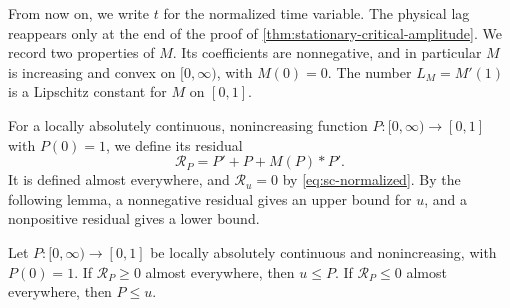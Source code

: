 From now on, we write $t$ for the normalized time variable. The physical lag reappears only at the end of the proof of \cref{thm:stationary-critical-amplitude}. We record two properties of $M$. Its coefficients are nonnegative, and in particular $M$ is increasing and convex on $[0,\infty)$, with $M(0)=0$. The number $L_M=M'(1)$ is a Lipschitz constant for $M$ on $[0,1]$.

For a locally absolutely continuous, nonincreasing function $P\colon[0,\infty)\to[0,1]$ with $P(0)=1$, we define its residual
\[
 \mathcal R_P=P'+P+M(P)*P' .
\]
It is defined almost everywhere, and $\mathcal R_u=0$ by \eqref{eq:sc-normalized}. By the following lemma, a nonnegative residual gives an upper bound for $u$, and a nonpositive residual gives a lower bound.

\begin{lemma}[Comparison]
\label{lem:sc-comparison}
Let $P\colon[0,\infty)\to[0,1]$ be locally absolutely continuous and nonincreasing, with $P(0)=1$. If $\mathcal R_P\ge0$ almost everywhere, then $u\le P$. If $\mathcal R_P\le0$ almost everywhere, then $P\le u$.
\end{lemma}

